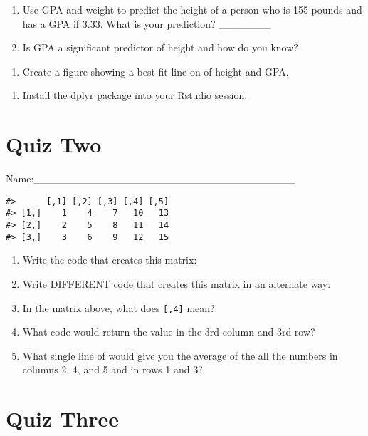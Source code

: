\documentclass[
]{book}
\providecommand{\tightlist}{%
  \setlength{\itemsep}{0pt}\setlength{\parskip}{0pt}}
\begin{document}
\begin{enumerate}
\def\labelenumi{\arabic{enumi}.}
\setcounter{enumi}{1}
\item
  Use GPA and weight to predict the height of a person who is 155 pounds and has a GPA if 3.33. What is your prediction? \_\_\_\_\_\_\_
\item
  Is GPA a significant predictor of height and how do you know?
\end{enumerate}

\begin{enumerate}
\def\labelenumi{\arabic{enumi}.}
\setcounter{enumi}{3}
\tightlist
\item
  Create a figure showing a best fit line on of height and GPA.
\end{enumerate}

\begin{enumerate}
\def\labelenumi{\arabic{enumi}.}
\setcounter{enumi}{4}
\tightlist
\item
  Install the dplyr package into your Rstudio session.
\end{enumerate}

\hypertarget{quiz-two}{%
\section{Quiz Two}\label{quiz-two}}

Name:\_\_\_\_\_\_\_\_\_\_\_\_\_\_\_\_\_\_\_\_\_\_\_\_\_\_\_\_\_\_\_\_\_\_\_

\begin{verbatim}
#>      [,1] [,2] [,3] [,4] [,5]
#> [1,]    1    4    7   10   13
#> [2,]    2    5    8   11   14
#> [3,]    3    6    9   12   15
\end{verbatim}

\begin{enumerate}
\def\labelenumi{\arabic{enumi}.}
\item
  Write the code that creates this matrix:
\item
  Write DIFFERENT code that creates this matrix in an alternate way:
\item
  In the matrix above, what does \texttt{{[},4{]}} mean?
\item
  What code would return the value in the 3rd column and 3rd row?
\item
  What single line of would give you the average of the all the numbers in columns 2, 4, and 5 and in rows 1 and 3?
\end{enumerate}

\hypertarget{quiz-three}{%
\section{Quiz Three}\label{quiz-three}}
\end{document}
